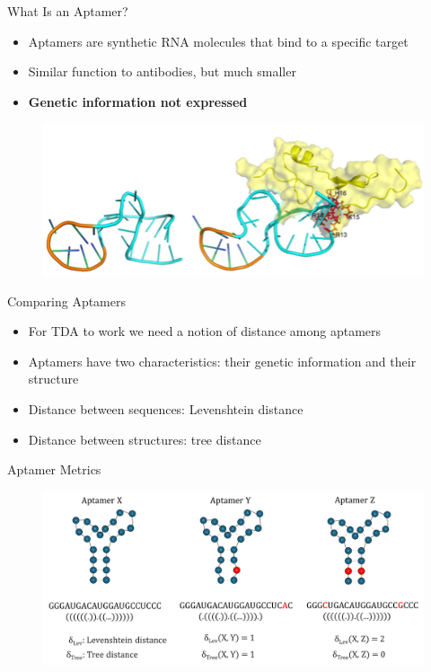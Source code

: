 \documentclass{beamer}
\begin{document}
\begin{frame}{What Is an Aptamer?}
\begin{itemize}
  \item Aptamers are synthetic RNA molecules that bind to a specific target
  \item Similar function to antibodies, but much smaller
  \item \textbf{Genetic information not expressed}
\end{itemize}
\begin{figure}
  \begin{center}
    \includegraphics[width=1\textwidth]{aptamer.png}\cite{aptamer}
  \end{center}  
\end{figure}
\end{frame}

\begin{frame}{Comparing Aptamers}
  \begin{itemize}
    \item For TDA to work we need a notion of distance among aptamers
    \item Aptamers have two characteristics: their genetic information and their structure
    \item Distance between sequences: Levenshtein distance
    \item Distance between structures: tree distance
  \end{itemize}
\end{frame}

\begin{frame}{Aptamer Metrics}
  \begin{figure}
    \begin{center}
      \hspace*{-.75cm}\includegraphics[width=1.1\textwidth]{aptamers.png}\cite{billapts}
    \end{center}
  \end{figure}
\end{frame}
\end{document}
